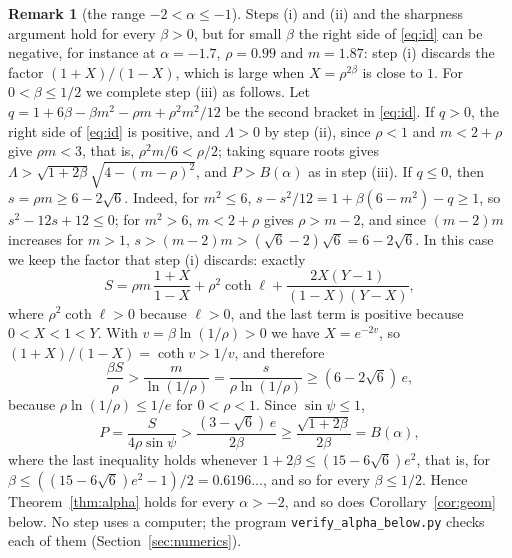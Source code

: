 \documentclass[11pt]{article}
\theoremstyle{definition}
\newtheorem{remark}{Remark}
\begin{document}
\begin{remark}[the range $-2 < \alpha \le -1$]\label{rem:below}
Steps (i) and (ii) and the sharpness argument hold for every $\beta > 0$, but for small $\beta$ the right side of \eqref{eq:id} can be negative, for instance at $\alpha = -1.7$, $\rho = 0.99$ and $m = 1.87$: step (i) discards the factor $(1 + X)/(1 - X)$, which is large when $X = \rho^{2\beta}$ is close to $1$. For $0 < \beta \le 1/2$ we complete step (iii) as follows. Let $q = 1 + 6\beta - \beta m^2 - \rho m + \rho^2 m^2/12$ be the second bracket in \eqref{eq:id}. If $q > 0$, the right side of \eqref{eq:id} is positive, and $\Lambda > 0$ by step (ii), since $\rho < 1$ and $m < 2 + \rho$ give $\rho m < 3$, that is, $\rho^2 m/6 < \rho/2$; taking square roots gives $\Lambda > \sqrt{1 + 2\beta}\sqrt{4 - (m - \rho)^2}$, and $P > B(\alpha)$ as in step (iii). If $q \le 0$, then $s = \rho m \ge 6 - 2\sqrt6$. Indeed, for $m^2 \le 6$, $s - s^2/12 = 1 + \beta(6 - m^2) - q \ge 1$, so $s^2 - 12s + 12 \le 0$; for $m^2 > 6$, $m < 2 + \rho$ gives $\rho > m - 2$, and since $(m - 2)m$ increases for $m > 1$, $s > (m - 2)m > (\sqrt6 - 2)\sqrt6 = 6 - 2\sqrt6$. In this case we keep the factor that step (i) discards: exactly
\[
S = \rho m\,\frac{1 + X}{1 - X} + \rho^2\coth\ell + \frac{2X(Y - 1)}{(1 - X)(Y - X)},
\]
where $\rho^2\coth\ell > 0$ because $\ell > 0$, and the last term is positive because $0 < X < 1 < Y$. With $v = \beta\ln(1/\rho) > 0$ we have $X = e^{-2v}$, so $(1 + X)/(1 - X) = \coth v > 1/v$, and therefore
\[
\frac{\beta S}{\rho} > \frac{m}{\ln(1/\rho)} = \frac{s}{\rho\ln(1/\rho)} \ge (6 - 2\sqrt6)\,e,
\]
because $\rho\ln(1/\rho) \le 1/e$ for $0 < \rho < 1$. Since $\sin\psi \le 1$,
\[
P = \frac{S}{4\rho\sin\psi} > \frac{(3 - \sqrt6)\,e}{2\beta} \ge \frac{\sqrt{1 + 2\beta}}{2\beta} = B(\alpha),
\]
where the last inequality holds whenever $1 + 2\beta \le (15 - 6\sqrt6)e^2$, that is, for $\beta \le ((15 - 6\sqrt6)e^2 - 1)/2 = 0.6196\ldots$, and so for every $\beta \le 1/2$. Hence Theorem~\ref{thm:alpha} holds for every $\alpha > -2$, and so does Corollary~\ref{cor:geom} below. No step uses a computer; the program \texttt{verify\_\allowbreak alpha\_\allowbreak below.py} checks each of them (Section~\ref{sec:numerics}).
\end{remark}
\end{document}
